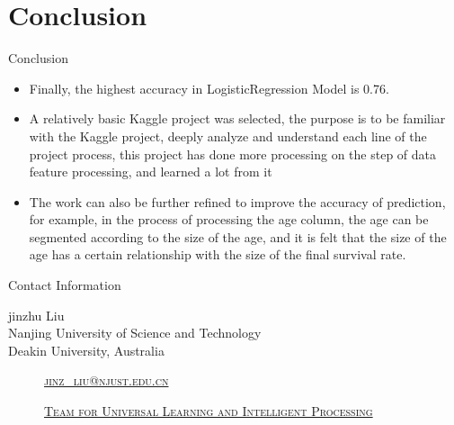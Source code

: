 \documentclass[
size=14pt,
paper=smartboard,  %
mode=present, 		%
display=slides, 	%
style=tuliplab,  	%
pauseslide,
fleqn,leqno]{powerdot}
\begin{document}
	
	\section{Conclusion}
	
	\begin{slide}{Conclusion}
		\begin{itemize}
			\item
			\smallskip
			Finally, the highest accuracy in LogisticRegression Model is 0.76.
			
			\item
			\smallskip
			A relatively basic Kaggle project was selected, the purpose is to be familiar with the Kaggle project, deeply analyze and understand each line of the project process, this project has done more processing on the step of data feature processing, and learned a lot from it
			
			\item
			\smallskip
			The work can also be further refined to improve the accuracy of prediction, for example, in the process of processing the age column, the age can be segmented according to the size of the age, and it is felt that the size of the age has a certain relationship with the size of the final survival rate.
			
		\end{itemize}
	\end{slide}
	
	
	\begin{wideslide}[toc=,bm=]{Contact Information}
		\centering
		\twocolumn[
		lcolwidth=0.35\linewidth,
		rcolwidth=0.65\linewidth
		]
		{
		}
		{
			jinzhu Liu\\
			Nanjing University of Science and Technology\\
			Deakin University, Australia
			\begin{description}
				\item[\textcolor{orange}{\faEnvelope}] \href{mailto:jinz_liu@njust.edu.cn}
				{\textsc{\footnotesize{jinz_liu@njust.edu.cn}}}
				
				\item[\textcolor{orange}{\faHome}] \href{http://www.tulip.org.au}
				{\textsc{\footnotesize{Team for Universal Learning and Intelligent Processing}}}
			\end{description}
		}
	\end{wideslide}
	
\end{document}
